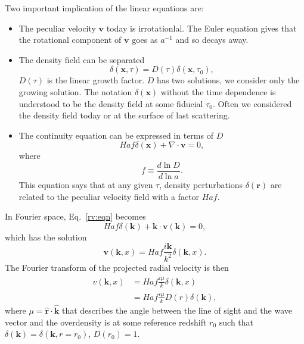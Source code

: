 \documentclass[11pt, oneside]{article}   	%
\begin{document}
Two important implication of the linear equations are:
\begin{itemize}
\item The peculiar velocity $\mathbf{v}$ today is irrotationlal. The Euler equation gives that the rotational component of $\mathbf{v}$ goes as $a^{-1}$ and so decays away.
\item The density field can be separated
\begin{equation}
\delta (\mathbf{x},\tau)  = D(\tau) \delta (\mathbf{x},\tau_0),
\end{equation}
$D(\tau)$ is  the linear growth factor.  $D$ has two solutions, we consider only the growing solution.
The notation  $\delta (\mathbf{x})$ without the time dependence is understood to be the density field at
some fiducial $\tau_0$.  Often we considered the density field today or at the surface of last scattering.
\item The continuity equation can be expressed in terms of $D$
\begin{equation}
Haf\delta(\mathbf{x}) + \nabla \cdot \mathbf{v}=0,
\label{rv:eqn}
\end{equation}
where
\begin{equation}
f \equiv \frac{d \ln{D}}{d\ln{a}}.
\label{f:eqn}
\end{equation}
This equation says that at any given $\tau$, density perturbations  $\delta(\mathbf{r})$
are related to the peculiar velocity field with a factor $Haf$.
\end{itemize}

In Fourier space, Eq.~\ref{rv:eqn} becomes
\begin{equation}
Haf\delta(\mathbf{k})  + \mathbf{k} \cdot \mathbf{v}(\mathbf{k})=0,
\end{equation}
which has the solution
\begin{equation}
 \mathbf{v}(\mathbf{k},x) = Haf \frac{i\mathbf{k}}{k^2} \delta(\mathbf{k},x).
\end{equation}
The Fourier transform of the projected radial velocity is then
\begin{align}
v(\mathbf{k},x) & = Haf \frac{i\mu}{k} \delta(\mathbf{k},x)\\
&=  Haf \frac{i\mu}{k} D(r) \delta(\mathbf{k}),
\label{dvfourier_Mpc:eqn}
\end{align}
where $\mu = \mathbf{\hat{r}} \cdot \mathbf{\hat{k}}$ that describes the angle between the line of sight and the wave vector
and the overdensity is at some reference redshift $r_0$ such that $\delta(\mathbf{k}) = \delta(\mathbf{k},r=r_0)$, $D(r_0)=1$.
\end{document}
